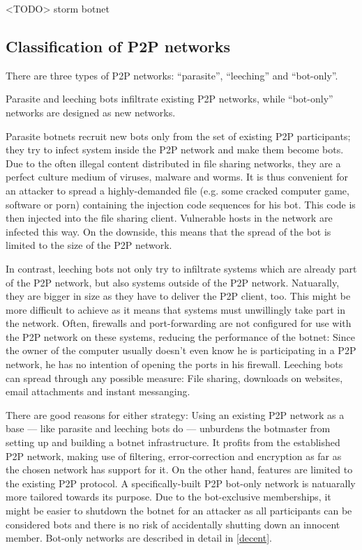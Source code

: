 \documentclass{llncs}
\begin{document}
<TODO> storm botnet

\subsection{Classification of P2P networks}
\label{ClassificP2P}
There are three types of P2P networks: ``parasite'', ``leeching'' and
``bot-only''.\cite{wang2009systematic} 

Parasite and leeching bots infiltrate existing P2P networks, while
``bot-only'' networks are designed as new networks. 

Parasite botnets recruit new bots only from the set of existing P2P
participants; they try to infect system inside the P2P network and
make them become bots. Due to the often illegal content distributed in
file sharing networks, they are a perfect culture medium of viruses,
malware and worms. It is thus convenient for an attacker to spread a
highly-demanded file (e.g. some cracked computer game, software or
porn) containing the injection code sequences for his bot. This code is
then injected into the file sharing client. Vulnerable hosts in the
network are infected this way. On the downside, this means that the
spread of the bot is limited to the size of the P2P network.

In contrast, leeching bots not only try to infiltrate systems which
are already part of the P2P network, but also systems outside of the
P2P network. Natuarally, they are bigger in size as they have to
deliver the P2P client, too. This might be more difficult to achieve
as it means that systems must unwillingly take part in the
network. Often, firewalls and port-forwarding are not configured for
use with the P2P network on these systems, reducing the performance of
the botnet: Since the owner of the computer usually doesn't even know
he is participating in a P2P network, he has no intention of opening
the ports in his firewall. Leeching bots can spread through any
possible measure: File sharing, downloads on websites, email
attachments and instant messanging.

There are good reasons for either strategy: Using an existing P2P
network as a base --- like parasite and leeching bots do --- unburdens
the botmaster from setting up and building a botnet infrastructure. It
profits from the established P2P network, making use of filtering,
error-correction and encryption as far as the chosen network has
support for it. On the other hand, features are limited to the
existing P2P protocol. A specifically-built P2P bot-only network is
natuarally more tailored towards its purpose. Due to the bot-exclusive
memberships, it might be easier to shutdown the botnet for an attacker
as all participants can be considered bots and there is no risk of
accidentally shutting down an innocent member. Bot-only networks are
described in detail in \ref{decent}.
\end{document}
